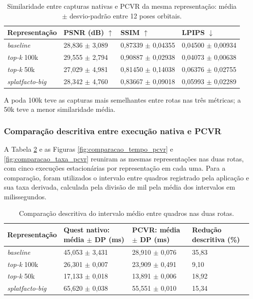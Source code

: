 \begin{table}[H]
\centering
\footnotesize
\caption{Similaridade entre capturas nativas e PCVR da mesma representação: média $\pm$ desvio-padrão entre 12 poses orbitais.}
\label{tab:similaridade_quest_pcvr}
\renewcommand{\arraystretch}{1.2}
\begin{tabularx}{\textwidth}{p{2.7cm}XXX}
\hline
\textbf{Representação} & \textbf{PSNR (dB) $\uparrow$} & \textbf{SSIM $\uparrow$} & \textbf{LPIPS $\downarrow$} \\ \hline
\textit{baseline} & 28,836 $\pm$ 3,089 & 0,87339 $\pm$ 0,04355 & 0,04500 $\pm$ 0,00934 \\
\textit{top-k} 100k & 29,555 $\pm$ 2,794 & 0,90887 $\pm$ 0,02938 & 0,04073 $\pm$ 0,00638 \\
\textit{top-k} 50k & 27,029 $\pm$ 4,981 & 0,81450 $\pm$ 0,14038 & 0,06376 $\pm$ 0,02755 \\
\textit{splatfacto-big} & 28,342 $\pm$ 4,760 & 0,83667 $\pm$ 0,09018 & 0,05993 $\pm$ 0,02289 \\ \hline
\end{tabularx}
\end{table}

A poda 100k teve as capturas mais semelhantes entre rotas nas três métricas; a 50k teve a menor similaridade média.

\subsubsection{Comparação descritiva entre execução nativa e PCVR}

A Tabela \ref{tab:comparacao_nativo_pcvr} e as Figuras \ref{fig:comparacao_tempo_pcvr} e \ref{fig:comparacao_taxa_pcvr} reuniram as mesmas representações nas duas rotas, com cinco execuções estacionárias por representação em cada uma. Para a comparação, foram utilizados o intervalo entre quadros registrado pela aplicação e sua taxa derivada, calculada pela divisão de mil pela média dos intervalos em milissegundos.

\begin{table}[H]
\centering
\footnotesize
\caption{Comparação descritiva do intervalo médio entre quadros nas duas rotas.}
\label{tab:comparacao_nativo_pcvr}
\renewcommand{\arraystretch}{1.2}
\begin{tabularx}{\textwidth}{p{3.0cm}XXX}
\hline
\textbf{Representação} & \textbf{Quest nativo: média $\pm$ DP (ms)} & \textbf{PCVR: média $\pm$ DP (ms)} & \textbf{Redução descritiva (\%)} \\ \hline
\textit{baseline} & 45,053 $\pm$ 3,431 & 28,910 $\pm$ 0,076 & 35,83 \\
\textit{top-k} 100k & 26,301 $\pm$ 0,007 & 23,909 $\pm$ 0,491 & 9,10 \\
\textit{top-k} 50k & 17,133 $\pm$ 0,018 & 13,891 $\pm$ 0,006 & 18,92 \\
\textit{splatfacto-big} & 65,620 $\pm$ 0,038 & 55,551 $\pm$ 0,010 & 15,34 \\ \hline
\end{tabularx}
\end{table}

